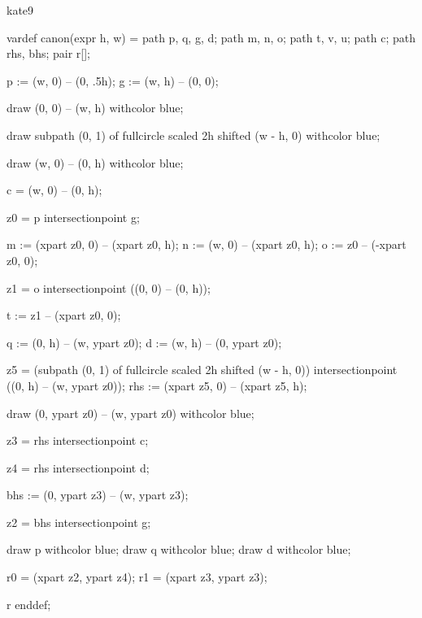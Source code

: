

\startenvironment kate9

	\startMPdefinitions
		vardef canon(expr h, w) =
			path p, q, g, d;
			path m, n, o;
			path t, v, u;
			path c;
			path rhs, bhs;
			pair r[];

			p := (w, 0) -- (0, .5h); %
			g := (w, h) -- (0, 0); %

			draw (0, 0) -- (w, h) withcolor blue;

			draw subpath (0, 1) of fullcircle scaled 2h shifted (w - h, 0) withcolor blue;

			draw (w, 0) -- (0, h) withcolor blue;

			c = (w, 0) -- (0, h);

			z0 = p intersectionpoint g; %

			m := (xpart z0, 0) -- (xpart z0, h); %
			n := (w, 0) -- (xpart z0, h); %
			o := z0 -- (-xpart z0, 0); %

			z1 = o intersectionpoint ((0, 0) -- (0, h)); %

			t := z1 -- (xpart z0, 0); %

			q := (0, h) -- (w, ypart z0); %
			d := (w, h) -- (0, ypart z0); %

			z5 = (subpath (0, 1) of fullcircle scaled 2h shifted (w - h, 0)) intersectionpoint ((0, h) -- (w, ypart z0));
			rhs := (xpart z5, 0) -- (xpart z5, h);

			draw (0, ypart z0) -- (w, ypart z0) withcolor blue;

			z3 = rhs intersectionpoint c;

			z4 = rhs intersectionpoint d; %

			bhs := (0, ypart z3) -- (w, ypart z3);

			z2 = bhs intersectionpoint g; %

			draw p withcolor blue;
			draw q withcolor blue;
			draw d withcolor blue;

			r0 = (xpart z2, ypart z4); %
			r1 = (xpart z3, ypart z3); %

			r
		enddef;

	\stopMPdefinitions

\stopenvironment


